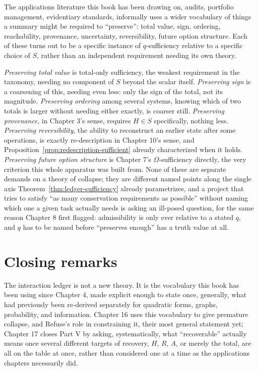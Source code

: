 \documentclass[11pt]{book}
\begin{document}
The applications literature this book has been drawing on, audits, portfolio management, evidentiary standards, informally uses a wider vocabulary of things a summary might be required to ``preserve'': total value, sign, ordering, reachability, provenance, uncertainty, reversibility, future option structure. Each of these turns out to be a specific instance of $q$-sufficiency relative to a specific choice of $S$, rather than an independent requirement needing its own theory.

\emph{Preserving total value} is total-only sufficiency, the weakest requirement in the taxonomy, needing no component of $S$ beyond the scalar itself. \emph{Preserving sign} is a coarsening of this, needing even less: only the sign of the total, not its magnitude. \emph{Preserving ordering} among several systems, knowing which of two totals is larger without needing either exactly, is coarser still. \emph{Preserving provenance}, in Chapter 3's sense, requires $H\in S$ specifically, nothing less. \emph{Preserving reversibility}, the ability to reconstruct an earlier state after some operations, is exactly re-description in Chapter 10's sense, and Proposition~\ref{prop:redescription-sufficient} already characterized when it holds. \emph{Preserving future option structure} is Chapter 7's $\Omega$-sufficiency directly, the very criterion this whole apparatus was built from. None of these are separate demands on a theory of collapse; they are different named points along the single axis Theorem~\ref{thm:ledger-sufficiency} already parametrizes, and a project that tries to satisfy ``as many conservation requirements as possible'' without naming which one a given task actually needs is asking an ill-posed question, for the same reason Chapter 8 first flagged: admissibility is only ever relative to a stated $q$, and $q$ has to be named before ``preserves enough'' has a truth value at all.

\section{Closing remarks}

The interaction ledger is not a new theory. It is the vocabulary this book has been using since Chapter 4, made explicit enough to state once, generally, what had previously been re-derived separately for quadratic forms, graphs, probability, and information. Chapter 16 uses this vocabulary to give premature collapse, and Refuse's role in constraining it, their most general statement yet; Chapter 17 closes Part V by asking, systematically, what ``recoverable'' actually means once several different targets of recovery, $H$, $R$, $A$, or merely the total, are all on the table at once, rather than considered one at a time as the applications chapters necessarily did.
\end{document}
